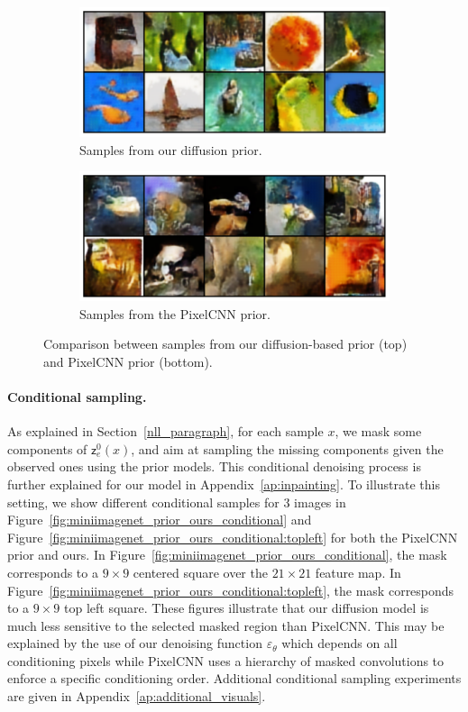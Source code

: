 \documentclass{article}
\theoremstyle{plain}
\theoremstyle{definition}
\theoremstyle{remark}
\newcommand{\latentcont}{\mathsf{z}_e}
\begin{document}
\begin{figure}[h!]

\begin{subfigure}{\linewidth}
    \centering
    \includegraphics[width=.7\linewidth]{./samples2.pdf}
    \caption{Samples from our diffusion prior.}
    \label{fig:diffusion_samples}
\end{subfigure}
\begin{subfigure}{\linewidth}
    \centering
    \includegraphics[width=.7\linewidth]{./pixel_samples.pdf}
    \caption{Samples from the PixelCNN prior.}
    \label{fig:pixel_samples}
\end{subfigure}
\caption{Comparison between samples from our diffusion-based prior (top) and PixelCNN prior (bottom).}
\label{fig:figures}
\end{figure}




\paragraph{Conditional sampling. }
As explained in Section~\ref{nll_paragraph},  for each sample $x$,  we mask some components of $\latentcont^0(x)$, and aim at sampling the missing components given the observed ones using the prior models. This conditional denoising process is further explained for our model in Appendix~\ref{ap:inpainting}. To illustrate this setting, we show different conditional samples for 3 images in Figure~\ref{fig:miniimagenet_prior_ours_conditional} and  Figure~\ref{fig:miniimagenet_prior_ours_conditional:topleft}  for both the PixelCNN prior and ours. In Figure~\ref{fig:miniimagenet_prior_ours_conditional},  the mask corresponds to a $9\times 9$ centered square over the $21\times 21$ feature map. In Figure~\ref{fig:miniimagenet_prior_ours_conditional:topleft},  the mask corresponds to a $9\times 9$ top left square. These figures illustrate that our diffusion model is much less sensitive to the selected masked region than PixelCNN. This may be explained by the use of our denoising function $\varepsilon_\theta$ which depends on all conditioning pixels while PixelCNN uses a hierarchy of masked convolutions to enforce
a specific conditioning order. Additional conditional sampling experiments are given in Appendix~\ref{ap:additional_visuals}.
\end{document}
